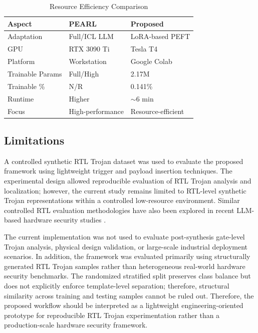 \documentclass[conference]{IEEEtran}
\begin{document}
\begin{table}[!t]
\caption{Resource Efficiency Comparison}
\label{tab:resource_efficiency}
\centering
\begin{tabular}{lll}
\toprule
Aspect & PEARL & Proposed \\
\midrule
Adaptation & Full/ICL LLM & LoRA-based PEFT \\
GPU & RTX 3090 Ti & Tesla T4 \\
Platform & Workstation & Google Colab \\
Trainable Params & Full/High & 2.17M \\
Trainable \% & N/R & 0.141\% \\
Runtime & Higher & $\sim$6 min \\
Focus & High-performance & Resource-efficient \\
\bottomrule
\end{tabular}
\end{table}

\subsection{Limitations}
\label{subsec:limitations}

A controlled synthetic RTL Trojan dataset was used to evaluate the proposed framework using lightweight trigger and payload insertion techniques. The experimental design allowed reproducible evaluation of RTL Trojan analysis and localization; however, the current study remains limited to RTL-level synthetic Trojan representations within a controlled low-resource environment. Similar controlled RTL evaluation methodologies have also been explored in recent LLM-based hardware security studies \cite{kundu2025pearl}.

The current implementation was not used to evaluate post-synthesis gate-level Trojan analysis, physical design validation, or large-scale industrial deployment scenarios. In addition, the framework was evaluated primarily using structurally generated RTL Trojan samples rather than heterogeneous real-world hardware security benchmarks. The randomized stratified split preserves class balance but does not explicitly enforce template-level separation; therefore, structural similarity across training and testing samples cannot be ruled out. Therefore, the proposed workflow should be interpreted as a lightweight engineering-oriented prototype for reproducible RTL Trojan experimentation rather than a production-scale hardware security framework.
\end{document}
